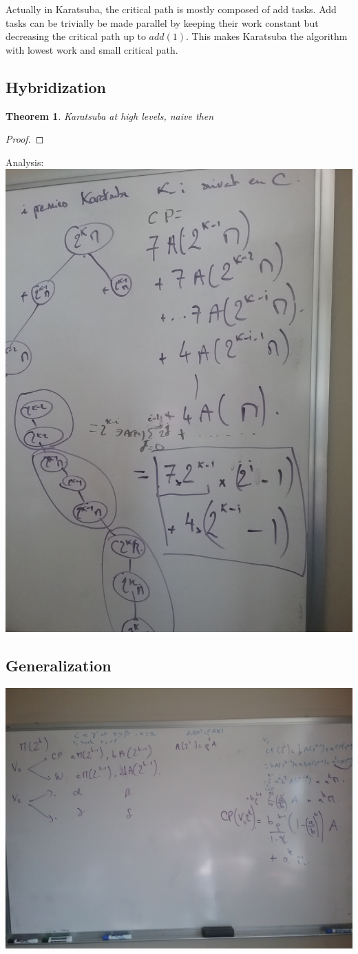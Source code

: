 \documentclass{article}
\newtheorem{theorem}{Theorem}
\begin{document}
Actually in Karatsuba, the critical path is mostly composed of add
tasks. Add tasks can be trivially be made parallel by keeping their
work constant but decreasing the critical path up to $add(1)$. This
makes Karatsuba the algorithm with lowest work and small critical path.

\subsection{Hybridization}

\begin{theorem}
Karatsuba at high levels, naive then
\end{theorem}

\begin{proof}
\end{proof}

Analysis: \includegraphics[width=.5\linewidth]{../../notes/20180608_142908.jpg}

\subsection{Generalization}

\includegraphics[width=.5\linewidth]{../../notes/20180608_172003.jpg}
\end{document}

